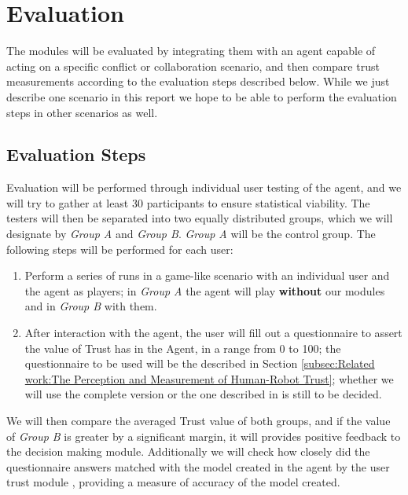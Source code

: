 \section{Evaluation}
\label{sec:Evaluation}

The modules will be evaluated by integrating them with an agent capable of acting on a specific conflict or collaboration scenario, and then compare trust measurements according to the evaluation steps described below. While we just describe one scenario in this report we hope to be able to perform the evaluation steps in other scenarios as well.

\subsection{Evaluation Steps}
\label{subsec:Evaluation:Evaluation Steps}
Evaluation will be performed through individual user testing of the agent, and we will try to gather at least 30 participants to ensure statistical viability. The testers will then be separated into two equally distributed groups, which we will designate by \textit{Group A} and \textit{Group B}. \textit{Group A} will be the control group. The following steps will be performed for each user:

\begin{enumerate}
	\item Perform a series of runs in a game-like scenario with an individual user and the agent as players; in \textit{Group A} the agent will play \textbf{without} our modules and in \textit{Group B} with them.
	\item After interaction with the agent, the user will fill out a questionnaire to assert the value of Trust has in the Agent, in a range from 0 to 100; the questionnaire to be used will be the described in Section \ref{subsec:Related work:The Perception and Measurement of Human-Robot Trust}; whether we will use the complete version or the one described in %
	is still to be decided.
\end{enumerate}

We will then compare the averaged Trust value of both groups, and if the value of \textit{Group B} is greater by a significant margin, it will provides positive feedback to the decision making module. Additionally we will check how closely did the questionnaire answers matched with the model created in the agent by the user trust module %
, providing a measure of accuracy of the model created.

